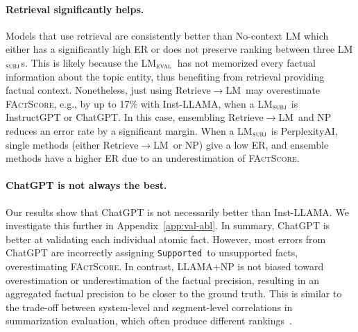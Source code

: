 \documentclass[11pt]{article}
\newcommand{\ours}{\textsc{FActScore}}
\newcommand{\subjectLM}{LM$_\textsc{subj}$}
\newcommand{\evalLM}{LM$_\textsc{eval}$}
\newcommand{\sLabel}{\texttt{Supported}}
\newcommand{\nsLabel}{\texttt{Not-supported}}
\newcommand{\rtg}{Retrieve$\rightarrow$LM}
\begin{document}
\paragraph{Retrieval significantly helps.}
Models that use retrieval are consistently better than No-context LM which either has a significantly high ER or does not preserve ranking between three \subjectLM{}s.
This is likely because the \evalLM\ has not memorized every factual information about the topic entity, thus benefiting from retrieval providing factual context.
%
Nonetheless, just using \rtg\ may overestimate \ours, e.g., by up to 17\% with Inst-LLAMA, when a \subjectLM{} is InstructGPT or ChatGPT.
In this case, ensembling \rtg\ and NP reduces an error rate by a significant margin. %
When a \subjectLM{} is PerplexityAI, single methods (either \rtg\ or NP) give a low ER, and ensemble methods have a higher ER due to an underestimation of \ours.

\vspace{-.3em}
\paragraph{ChatGPT is not always the best.}
Our results show that ChatGPT is not necessarily better than Inst-LLAMA. We investigate this further in Appendix~\ref{app:val-abl}. In summary, ChatGPT is better at validating each individual atomic fact. However, most errors from ChatGPT are incorrectly assigning \sLabel\ to unsupported facts, overestimating \ours.
In contrast, LLAMA+NP is not biased toward overestimation or underestimation of the factual precision, resulting in an aggregated factual precision to be closer to the ground truth.
This is similar to the trade-off between system-level and segment-level correlations in summarization evaluation, which often produce different rankings~\citep{bhandari-etal-2020-evaluating,deutsch2021towards}.
\end{document}
